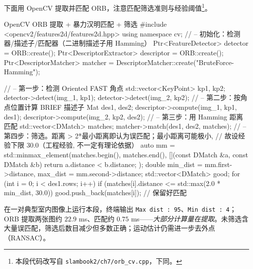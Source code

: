 \begin{practice}
下面用 OpenCV 提取并匹配 ORB，注意匹配筛选准则与经验阈值\footnote{本段代码改写自 \texttt{slambook2/ch7/orb\_cv.cpp}\cite{gaoxiang2019slam14}，下同。}。
\begin{codebox}[C++]{OpenCV ORB 提取 + 暴力汉明匹配 + 筛选}
#include <opencv2/features2d/features2d.hpp>
using namespace cv;
// -- 初始化：检测器/描述子/匹配器（二进制描述子用 Hamming）
Ptr<FeatureDetector>   detector  = ORB::create();
Ptr<DescriptorExtractor> descriptor = ORB::create();
Ptr<DescriptorMatcher> matcher = DescriptorMatcher::create("BruteForce-Hamming");

// -- 第一步：检测 Oriented FAST 角点
std::vector<KeyPoint> kp1, kp2;
detector->detect(img_1, kp1);
detector->detect(img_2, kp2);
// -- 第二步：按角点位置计算 BRIEF 描述子
Mat des1, des2;
descriptor->compute(img_1, kp1, des1);
descriptor->compute(img_2, kp2, des2);
// -- 第三步：用 Hamming 距离匹配
std::vector<DMatch> matches;
matcher->match(des1, des2, matches);
// -- 第四步：筛选。距离 > 2*最小距离即认为误匹配；最小距离可能极小,
//    故设经验下限 30.0（工程经验, 不一定有理论依据）
auto mm = std::minmax_element(matches.begin(), matches.end(),
    [](const DMatch &a, const DMatch &b){ return a.distance < b.distance; });
double min_dist = mm.first->distance, max_dist = mm.second->distance;
std::vector<DMatch> good;
for (int i = 0; i < des1.rows; i++)
    if (matches[i].distance <= std::max(2.0 * min_dist, 30.0))
        good.push_back(matches[i]);   // 保留好匹配
\end{codebox}
在一对典型室内图像上运行本段，终端输出 \texttt{Max dist : 95}、\texttt{Min dist : 4}；ORB 提取两张图约 $22.9$ ms、匹配约 $0.75$ ms——\emph{大部分计算量在提取}。未筛选含大量误匹配，筛选后数目减少但多数正确；运动估计仍需进一步去外点（RANSAC）。
\end{practice}

